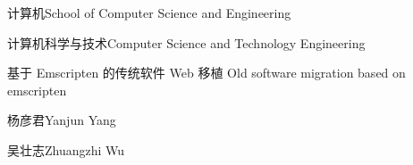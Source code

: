 
\school
{计算机}{School of Computer Science and Engineering}

\major
{计算机科学与技术}{Computer Science and Technology Engineering}

\thesistitle
{基于 Emscripten 的传统软件 Web 移植}
{}
{Old software migration based on emscripten}
{}


\thesisauthor 
{杨彦君}{Yanjun Yang}

\teacher
{吴壮志}{Zhuangzhi Wu}






